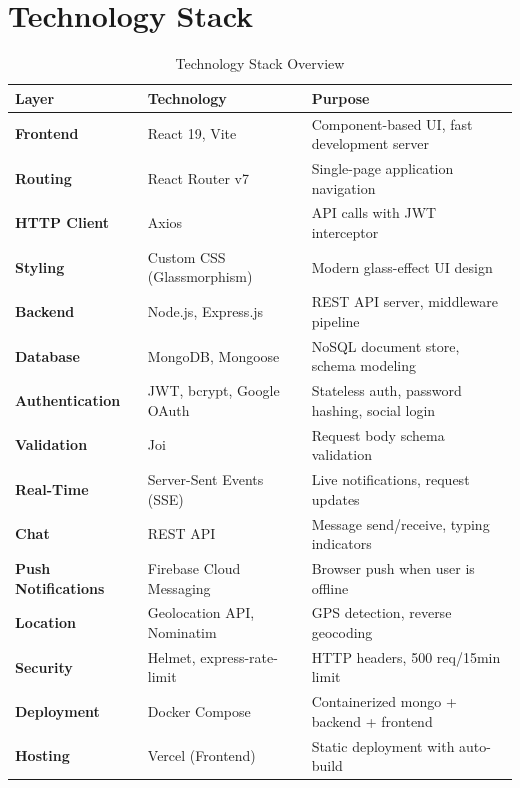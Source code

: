 \documentclass[12pt,a4paper]{article}
\begin{document}
\section{Technology Stack}

\begin{table}[H]
\centering
\renewcommand{\arraystretch}{1.5}
\begin{tabularx}{\textwidth}{|>{\bfseries\color{dark}}l|X|X|}
    \hline
    \textbf{Layer} & \textbf{Technology} & \textbf{Purpose} \\
    \hline
    Frontend & React 19, Vite & Component-based UI, fast development server \\
    \hline
    Routing & React Router v7 & Single-page application navigation \\
    \hline
    HTTP Client & Axios & API calls with JWT interceptor \\
    \hline
    Styling & Custom CSS (Glassmorphism) & Modern glass-effect UI design \\
    \hline
    Backend & Node.js, Express.js & REST API server, middleware pipeline \\
    \hline
    Database & MongoDB, Mongoose & NoSQL document store, schema modeling \\
    \hline
    Authentication & JWT, bcrypt, Google OAuth & Stateless auth, password hashing, social login \\
    \hline
    Validation & Joi & Request body schema validation \\
    \hline
    Real-Time & Server-Sent Events (SSE) & Live notifications, request updates \\
    \hline
    Chat & REST API & Message send/receive, typing indicators \\
    \hline
    Push Notifications & Firebase Cloud Messaging & Browser push when user is offline \\
    \hline
    Location & Geolocation API, Nominatim & GPS detection, reverse geocoding \\
    \hline
    Security & Helmet, express-rate-limit & HTTP headers, 500 req/15min limit \\
    \hline
    Deployment & Docker Compose & Containerized mongo + backend + frontend \\
    \hline
    Hosting & Vercel (Frontend) & Static deployment with auto-build \\
    \hline
\end{tabularx}
\caption{Technology Stack Overview}
\end{table}
\end{document}
